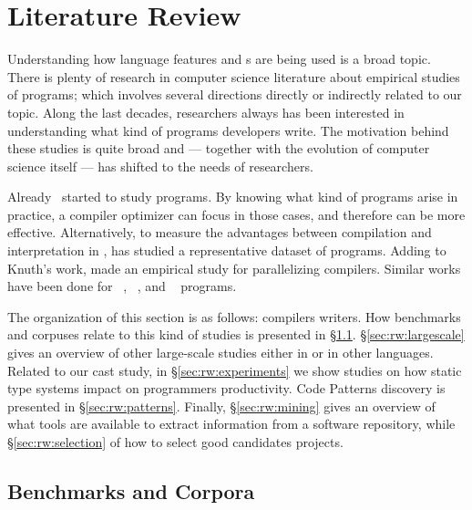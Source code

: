 
\chapter{Literature Review}
\label{cha:literature-review}

Understanding how language features and \api{}s are being used is a broad topic.
There is plenty of research in computer science literature about empirical studies of programs; which involves several directions directly or indirectly related to our topic.
Along the last decades, researchers always has been interested in understanding what kind of programs developers write.
The motivation behind these studies is quite broad and --- together with the evolution of computer science itself --- has shifted to the needs of researchers.

Already~\cite{knuthEmpiricalStudyFORTRAN1971} started to study \fortran{} programs.
By knowing what kind of programs arise in practice, a compiler optimizer can focus in those cases, and therefore can be more effective.
Alternatively, to measure the advantages between compilation and interpretation in \basic{}, \cite{hammondBASICEvaluationProcessing1977} has studied a representative dataset of programs.
Adding to Knuth's work, \cite{shenEmpiricalStudyFortran1990} made an empirical study for parallelizing compilers.
Similar works have been done for \cobol{}~\cite{salvadoriStaticProfileCOBOL1975,chevanceStaticProfileDynamic1978}, \pascal{}~\cite{cookContextualAnalysisPascal1982}, and \apl{}~\cite{saalPropertiesAPLPrograms1975,saalEmpiricalStudyAPL1977} programs. 

The organization of this section is as follows: 
compilers writers. 
How benchmarks and corpuses relate to this kind of studies is
presented in \S\ref{sec:rw:benchmarks}. 
\S\ref{sec:rw:largescale} gives an overview of other large-scale studies either in \java{} or in other languages. 
Related to our cast study, in \S\ref{sec:rw:experiments} we show studies on how static type systems impact on programmers productivity. 
Code Patterns discovery is presented in \S\ref{sec:rw:patterns}. 
Finally, \S\ref{sec:rw:mining} gives an overview of what tools are available to extract information from a software repository,
while \S\ref{sec:rw:selection} of how to select good candidates projects. 


\section{Benchmarks and Corpora}
\label{sec:rw:benchmarks}

